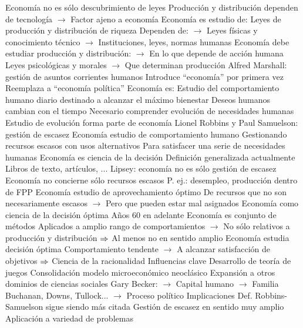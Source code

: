 \documentclass{nuevotema}
\begin{document}
\begin{esquemal}
				\4 Economía no es sólo descubrimiento de leyes
				\4[] Producción y distribución dependen de tecnología
				\4[] $\to$ Factor ajeno a economía
				\4[$\Rightarrow$] Economía es estudio de:
				\4 Leyes de producción y distribución de riqueza
				\4[] Dependen de:
				\4[] $\to$ Leyes físicas y conocimiento técnico
				\4[] $\to$ Instituciones, leyes, normas humanas
				\4[] Economía debe estudiar producción y distribución:
				\4[] $\to$ En lo que depende de acción humana
				\4[$\then$] Leyes psicológicas y morales
				\4[] $\to$ Que determinan producción
			\3 Alfred Marshall: gestión de asuntos corrientes humanos
				\4 Introduce ``economía'' por primera vez
				\4[] Reemplaza a ``economía política''
				\4 Economía es:
				\4[] Estudio del comportamiento humano diario
				\4[] destinado a alcanzar el máximo bienestar
				\4 Deseos humanos cambian con el tiempo
				\4[] Necesario comprender evolución de necesidades humanas
				\4[] Estudio de evolución forma parte de economía
			\3 Lionel Robbins y Paul Samuelson: gestión de escasez
				\4 Economía estudio de comportamiento humano
				\4[] Gestionando recursos escasos con usos alternativos
				\4[] Para satisfacer una serie de necesidades humanas
				\4[$\Rightarrow$] Economía es ciencia de la decisión
				\4 Definición generalizada actualmente
				\4[] Libros de texto, artículos, ...
			\3 Lipsey: economía no es sólo gestión de escasez
				\4 Economía no concierne sólo recursos escasos
				\4[] P. ej.: desempleo, producción dentro de FPP
				\4 Economía estudio de aprovechamiento óptimo
				\4[] De recursos que no son necesariamente escasos
				\4[] $\to$ Pero que pueden estar mal asignados
			\3 Economía como ciencia de la decisión óptima
				\4 Años 60 en adelante
				\4 Economía es conjunto de métodos
				\4[] Aplicados a amplio rango de comportamientos
				\4[] $\to$ No sólo relativos a producción y distribución
				\4[] $\then$ Al menos no en sentido amplio
				\4 Economía estudia decisión óptima
				\4[] Comportamiento tendente
				\4[] $\to$ A alcanzar satisfacción de objetivos
				\4[] $\then$ Ciencia de la racionalidad
				\4 Influencias clave
				\4[] Desarrollo de teoría de juegos
				\4[] Consolidación modelo microeconómico neoclásico
				\4 Expansión a otros dominios de ciencias sociales
				\4[] Gary Becker:
				\4[] $\to$ Capital humano
				\4[] $\to$ Familia
				\4[] Buchanan, Downs, Tullock...
				\4[] $\to$ Proceso político
			\3 Implicaciones
				\4 Def. Robbins-Samuelson sigue siendo más citada
				\4 Gestión de escasez en sentido muy amplio
				\4 Aplicación a variedad de problemas

\end{esquemal}
\end{document}
